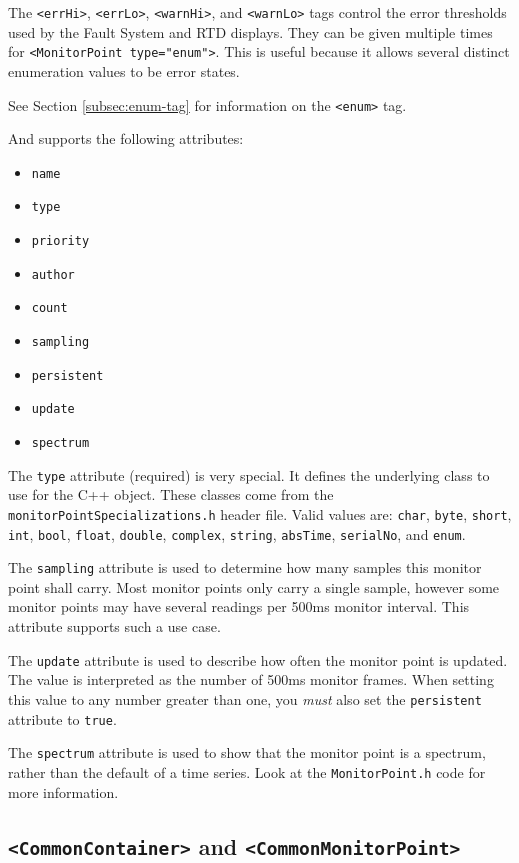 \documentclass[letterpaper,12pt,oneside,pdftex]{article}
\newcommand{\mpml}[1]{\texttt{<#1>}}
\newcommand{\attr}[1]{\texttt{#1}}
\newenvironment{pitemize}{
\begin{itemize}
  \setlength{\itemsep}{1pt}
  \setlength{\parskip}{0pt}
  \setlength{\parsep}{0pt}
}{\end{itemize}}
\begin{document}
The \mpml{errHi}, \mpml{errLo}, \mpml{warnHi}, and \mpml{warnLo} tags control
the error thresholds used by the Fault System and RTD displays. They can be
given multiple times for \mpml{MonitorPoint type="enum"}. This is useful because
it allows several distinct enumeration values to be error states.

See Section \ref{subsec:enum-tag} for information on the \mpml{enum} tag.

And supports the following attributes:

\begin{pitemize}
\item \attr{name}
\item \attr{type}
\item \attr{priority}
\item \attr{author}
\item \attr{count}
\item \attr{sampling}
\item \attr{persistent}
\item \attr{update}
\item \attr{spectrum}
\end{pitemize}

The \attr{type} attribute (required) is very special. It defines the underlying
class to use for the C++ object. These classes come from the
\texttt{monitorPointSpecializations.h} header file. Valid values are:
\texttt{char}, \texttt{byte}, \texttt{short}, \texttt{int}, \texttt{bool},
\texttt{float}, \texttt{double}, \texttt{complex}, \texttt{string},
\texttt{absTime}, \texttt{serialNo}, and \texttt{enum}.

The \attr{sampling} attribute is used to determine how many samples this monitor
point shall carry. Most monitor points only carry a single sample, however some
monitor points may have several readings per 500ms monitor interval. This
attribute supports such a use case.

The \attr{update} attribute is used to describe how often the monitor point is
updated. The value is interpreted as the number of 500ms monitor frames. When
setting this value to any number greater than one, you \emph{must} also set the
\attr{persistent} attribute to \texttt{true}.

The \attr{spectrum} attribute is used to show that the monitor point is a
spectrum, rather than the default of a time series. Look at the
\texttt{MonitorPoint.h} code for more information.

\subsection{\mpml{CommonContainer} and \mpml{CommonMonitorPoint}}
\label{subsec:CommonReference}
\end{document}
